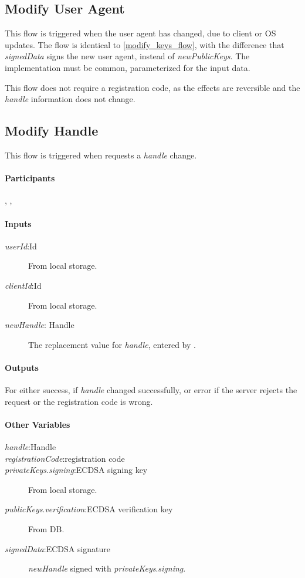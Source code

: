\documentclass[a4paper,10pt,draft]{article}
\newcommand{\signedData}{\emph{signedData}}
\newcommand{\newPublicKeys}{\emph{newPublicKeys}}
\newcommand{\handle}{\emph{handle}}
\newcommand{\registrationCode}{\emph{registrationCode}}
\newcommand{\privateKeys}{\emph{privateKeys}}
\newcommand{\publicKeys}{\emph{publicKeys}}
\newcommand{\signingKey}{\privateKeys{}.\emph{signing}}
\newcommand{\verificationKey}{\publicKeys{}.\emph{verification}}
\newcommand{\userId}{\emph{userId}}
\newcommand{\clientId}{\emph{clientId}}
\newcommand{\newHandle}{\emph{newHandle}}
\begin{document}
\subsection{Modify User Agent}
\label{modify_user_agent_flow}
This flow is triggered when the user agent has changed, due to client or OS updates. The flow is identical to \ref{modify_keys_flow}, with the difference that \signedData{} 
signs the new user agent, instead of \newPublicKeys{}. The implementation must be common, parameterized for the input data.

This flow does not require a registration code, as the effects are reversible and the \handle{} information does not change.

\subsection{Modify Handle}
This flow is triggered when \User{} requests a \handle{} change.

\paragraph{Participants} \Client{}, \Server{}, \User{}

\paragraph{Inputs}
\SpecialItem
\begin{description}
 \item[\userId{}:Id] From \Client{} local storage.
 \item[\clientId{}:Id] From \Client{} local storage.
 \item[\newHandle{}: Handle] The replacement value for \handle{}, entered by \User{}.
\end{description}

\paragraph{Outputs}
For \Client{} either success, if \handle{} changed successfully, or error if the server rejects the request or the registration code is wrong.

\paragraph{Other Variables}
\SpecialItem
\begin{description}
 \item[\handle{}:Handle]
 \item[\registrationCode{}:registration code]
 \item[\signingKey{}:ECDSA signing key] From \Client{} local storage.
 \item[\verificationKey{}:ECDSA verification key] From \Server{} DB.
 \item[\signedData{}:ECDSA signature] \newHandle{} signed with \signingKey{}.
\end{description}
\end{document}
